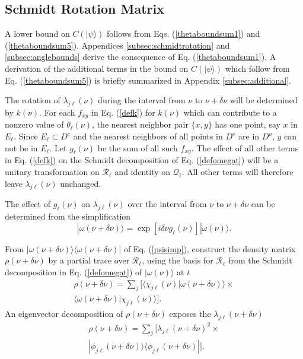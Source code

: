 \documentclass[12pt,amsmath,amssymb,onecolumn]{revtex4-2}
\begin{document}
\subsection{\label{subsec:schmidtrotation} Schmidt Rotation Matrix}

A lower bound on $C(|\psi \rangle )$  follows from Eqs. (\ref{thetaboundsum1}) and (\ref{thetaboundsum5}). 
Appendices \ref{subsec:schmidtrotation}
and \ref{subsec:anglebounds} derive the consequence of Eq. (\ref{thetaboundsum1}).
A derivation of the additional terms in the bound on $C(|\psi \rangle )$
which follow
from Eq. (\ref{thetaboundsum5}) is briefly summarized in Appendix \ref{subsec:additional}.

The rotation of $\lambda_{j\ell} (\nu)$ during the interval from $\nu$ to $\nu + \delta \nu$
will be determined by $k(\nu)$. For each $f_{xy}$ in Eq. (\ref{defk}) for $k(\nu)$ which can contribute to 
a nonzero value of $\theta_{\ell}(\nu)$, the nearest neighbor pair $\{x, y\}$ has one point, say $x$ in $E_{\ell}$.
Since $E_{\ell} \subset D^e$ and the nearest neighbors of all points in $D^e$ are in
$D^o$, $y$ can not be in $E_\ell$. Let $g_{\ell}(\nu)$ be the sum of all such $f_{xy}$.
The effect of all other terms in Eq. (\ref{defk}) on the
Schmidt decomposition of Eq. (\ref{defomegat}) will be
a unitary transformation on $\mathcal{R}_\ell$ and identity on $\mathcal{Q}_\ell$.
All other terms will therefore leave $\lambda_{j\ell}( \nu)$ unchanged.

The effect of $g_{\ell}(\nu)$ on $\lambda_{j\ell}(\nu)$ over the
interval from $\nu$ to $\nu + \delta \nu$ can be determined from the simplification
\begin{equation}
\label{psisimp}
|\omega(\nu + \delta \nu) \rangle  = \exp[ i \delta \nu g_{\ell}(\nu)] |\omega(\nu) \rangle .
\end{equation}

From $|\omega(\nu + \delta \nu) \rangle  \langle \omega(\nu + \delta \nu)|$ of Eq. (\ref{psisimp}),
construct the density matrix $\rho(\nu + \delta \nu)$ by 
a partial trace over $\mathcal{R}_{\ell}$, 
using the basis for $\mathcal{R}_{\ell}$
from the Schmidt decomposition in Eq. (\ref{defomegat}) of $|\omega(\nu) \rangle $ at $t$
\begin{multline}
\label{defrho}
\rho(\nu + \delta \nu) = 
\sum_j [ \langle  \chi_{j\ell}(\nu)|\omega(\nu + \delta \nu) \rangle  \times \\ \langle \omega(\nu + \delta \nu)|\chi_{j\ell}(\nu) \rangle ].
\end{multline} 
An eigenvector decomposition of $\rho(\nu + \delta \nu)$ exposes
the $\lambda_{j\ell}(\nu + \delta \nu)$
\begin{multline}
\label{rhodeltat}
\rho(\nu + \delta \nu) = 
\sum_j [\lambda_{j\ell}( \nu + \delta \nu)^2 \times \\
 |\phi_{j\ell}(\nu + \delta \nu) \rangle  \langle \phi_{j\ell}( \nu + \delta \nu)|].
\end{multline}
\end{document}
